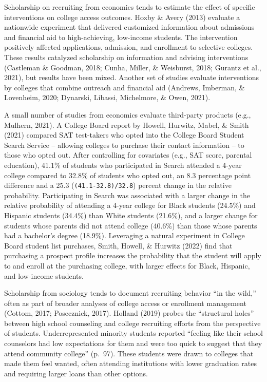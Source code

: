 \documentclass[
  12pt,
]{article}
\begin{document}
Scholarship on recruiting from economics tends to estimate the effect of specific interventions on college access outcomes. Hoxby \& Avery (2013) evaluate a nationwide experiment that delivered customized information about admissions and financial aid to high-achieving, low-income students. The intervention positively affected applications, admission, and enrollment to selective colleges. These results catalyzed scholarship on information and advising interventions (Castleman \& Goodman, 2018; Cunha, Miller, \& Weisburst, 2018; Gurantz et al., 2021), but results have been mixed. Another set of studies evaluate interventions by colleges that combine outreach and financial aid (Andrews, Imberman, \& Lovenheim, 2020; Dynarski, Libassi, Michelmore, \& Owen, 2021).

A small number of studies from economics evaluate third-party products (e.g., Mulhern, 2021). A College Board report by Howell, Hurwitz, Mabel, \& Smith (2021) compared SAT test-takers who opted into the College Board Student Search Service -- allowing colleges to purchase their contact information -- to those who opted out. After controlling for covariates (e.g., SAT score, parental education), 41.1\% of students who participated in Search attended a 4-year college compared to 32.8\% of students who opted out, an 8.3 percentage point difference and a 25.3 (\texttt{(41.1-32.8)/32.8}) percent change in the relative probability. Participating in Search was associated with a larger change in the relative probability of attending a 4-year college for Black students (24.5\%) and Hispanic students (34.4\%) than White students (21.6\%), and a larger change for students whose parents did not attend college (40.6\%) than those whose parents had a bachelor's degree (18.9\%). Leveraging a natural experiment in College Board student list purchases, Smith, Howell, \& Hurwitz (2022) find that purchasing a prospect profile increases the probability that the student will apply to and enroll at the purchasing college, with larger effects for Black, Hispanic, and low-income students.

Scholarship from sociology tends to document recruiting behavior ``in the wild,'' often as part of broader analyses of college access or enrollment management (Cottom, 2017; Posecznick, 2017). Holland (2019) probes the ``structural holes'' between high school counseling and college recruiting efforts from the perspective of students. Underrepresented minority students reported ``feeling like their school counselors had low expectations for them and were too quick to suggest that they attend community college'' (p.~97). These students were drawn to colleges that made them feel wanted, often attending institutions with lower graduation rates and requiring larger loans than other options.
\end{document}
